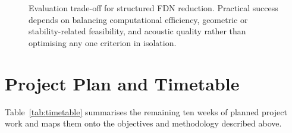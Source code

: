 \documentclass[12pt,a4paper]{article}
\begin{document}
\begin{figure}[t]
{
    }
    \caption{\footnotesize Evaluation trade-off for structured FDN reduction. Practical success depends on balancing computational efficiency, geometric or stability-related feasibility, and acoustic quality rather than optimising any one criterion in isolation.}
    \label{fig:tradeoff}
\end{figure}





\section{Project Plan and Timetable}

Table~\ref{tab:timetable} summarises the remaining ten weeks of planned project
work and maps them onto the objectives and methodology described above.
\end{document}
